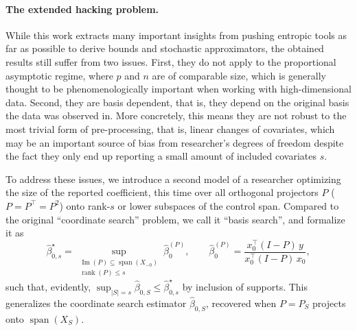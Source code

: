 


\paragraph{The extended hacking problem.} While this work extracts many important insights from pushing entropic tools as far as possible to derive bounds and stochastic approximators, the obtained results still suffer from two issues. First, they do not apply to the proportional asymptotic regime, where $p$ and $n$ are of comparable size, which is generally thought to be phenomenologically important when working with high-dimensional data. Second, they are basis dependent, that is, they depend on the original basis the data was observed in. More concretely, this means they are not robust to the most trivial form of pre-processing, that is, linear changes of covariates, which may be an important source of bias from researcher's degrees of freedom despite the fact they only end up reporting a small amount of included covariates $s$.

To address these issues, we introduce a second model of a researcher optimizing the size of the reported coefficient, this time over all orthogonal projectors $P$ ($P = P^\top = P^2$) onto rank-$s$ or lower subspaces of the control span. Compared to the original ``coordinate search'' problem, we call it ``basis search'', and formalize it as
\begin{equation}\label{eq:relaxed-search}
        \hat\beta_{0,s}^\star
        =
        \sup_{\substack{\operatorname{Im}(P)\subseteq\operatorname{span}(X_{-0})\\ \operatorname{rank}(P)\le s}} \hat\beta_0^{(P)},
        \qquad
        \hat\beta_0^{(P)} = \frac{x_0^\top (I-P)\, y}{x_0^\top (I-P)\, x_0},
\end{equation}
such that, evidently, $\sup_{|S|=s} \hat\beta_{0,S} \leq \hat\beta_{0,s}^\star$ by inclusion of supports. This generalizes the coordinate search estimator $\hat\beta_{0,S}$, recovered when $P = P_S$ projects onto $\operatorname{span}(X_S)$. 

